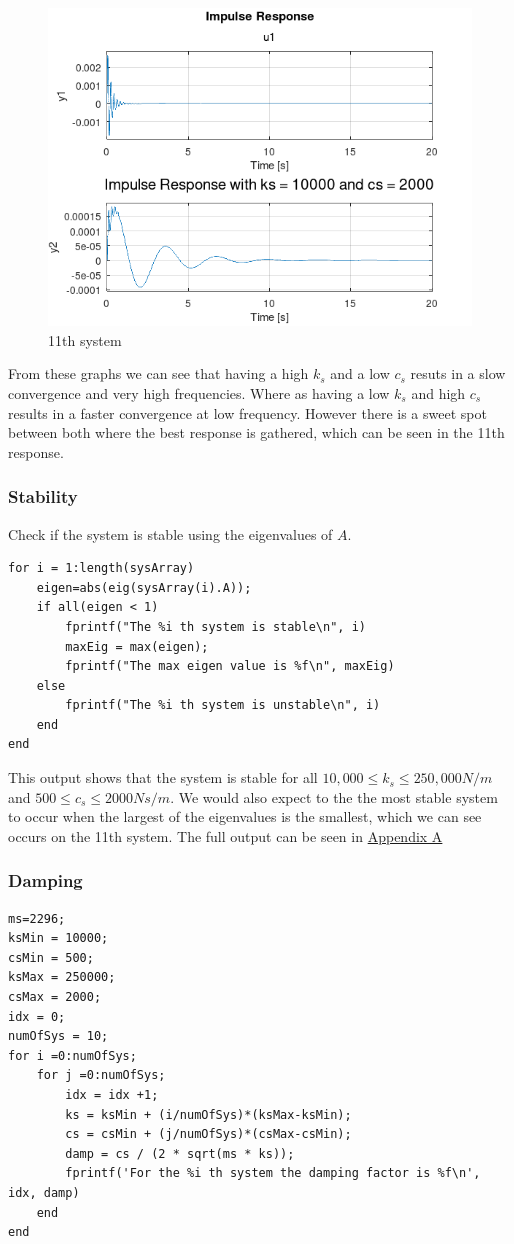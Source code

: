 \documentclass[11pt]{article}
\begin{document}
\begin{figure}[H]
    \centering
    \includegraphics[width=.9\linewidth]{ENG204-Assignment-2-Impulse-Response-11.png}
    \caption{11th system}
    \label{fig:impulse_response_22}
\end{figure}

From these graphs we can see that having a high \(k_s\) and a low \(c_s\) resuts in a slow convergence and very high frequencies. Where as having a low \(k_s\) and high \(c_s\) results in a faster convergence at low frequency. However there is a sweet spot between both where the best response is gathered, which can be seen in the 11th response.
\subsubsection{Stability}
\label{sec:org6a1b386}
Check if the system is stable using the eigenvalues of \(A\).
\begin{verbatim}
for i = 1:length(sysArray)
    eigen=abs(eig(sysArray(i).A));
    if all(eigen < 1)
        fprintf("The %i th system is stable\n", i)
        maxEig = max(eigen);
        fprintf("The max eigen value is %f\n", maxEig)
    else
        fprintf("The %i th system is unstable\n", i)
    end
end
\end{verbatim}


This output shows that the system is stable for all \(10,000\leq k_s\leq 250,000 N/m\) and \(500 \leq c_s \leq 2000 Ns/m\). We would also expect to the the most stable system to occur when the largest of the eigenvalues is the smallest, which we can see occurs on the 11th system. The full output can be seen in \hyperref[sec:org5ab6351]{Appendix A}
\subsubsection{Damping}
\label{sec:org77cbc0f}
\begin{verbatim}
ms=2296;
ksMin = 10000;
csMin = 500;
ksMax = 250000;
csMax = 2000;
idx = 0;
numOfSys = 10;
for i =0:numOfSys;
    for j =0:numOfSys;
        idx = idx +1;
        ks = ksMin + (i/numOfSys)*(ksMax-ksMin);
        cs = csMin + (j/numOfSys)*(csMax-csMin);
        damp = cs / (2 * sqrt(ms * ks));
        fprintf('For the %i th system the damping factor is %f\n', idx, damp)
    end
end
\end{verbatim}
\end{document}
